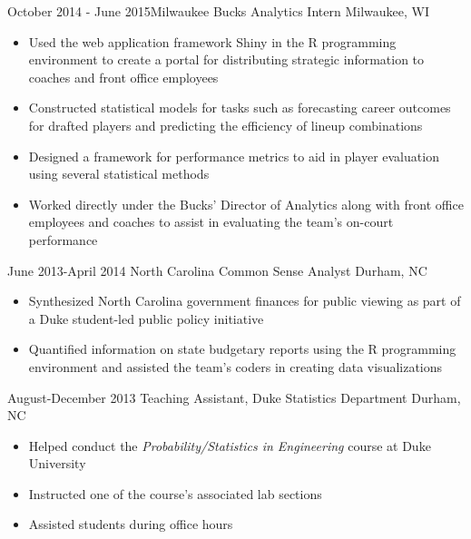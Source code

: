 \documentclass[10pt,a4paper,sans]{moderncv}        %
\begin{document}
\cventry
  {October 2014 - June 2015}{Milwaukee Bucks Analytics Intern}
  {}
  {Milwaukee, WI}
  {}
  {
    \begin{itemize}
      \item{Used the web application framework Shiny in the R programming environment to create a portal for distributing strategic information to coaches and front office employees}
      \item{Constructed statistical models for tasks such as forecasting career outcomes for drafted players and predicting the 
      efficiency of lineup combinations}
      \item{Designed a framework for performance metrics to aid in player evaluation using several statistical methods}
      \item{Worked directly under the Bucks' Director of Analytics along with front office employees and coaches to assist in evaluating 
      the team's on-court performance}
    \end{itemize}
  }

\cventry
  {June 2013-April 2014}
  {North Carolina Common Sense Analyst}
  {}
  {Durham, NC}
  {}
  {
    \begin{itemize}
      \item{Synthesized North Carolina government finances for public viewing as part of a Duke student-led public policy initiative}
      \item{Quantified information on state budgetary reports using the R programming environment and assisted the team's coders in creating 
      data visualizations}
    \end{itemize}
  }
    
\cventry
  {August-December 2013}
  {Teaching Assistant, Duke Statistics Department}
  {}
  {Durham, NC}
  {}
  {
    \begin{itemize}
      \item{Helped conduct the \emph{Probability/Statistics in Engineering} course at Duke University}
      \item{Instructed one of the course's associated lab sections} 
      \item{Assisted students during office hours}
    \end{itemize}
  }

\clearpage
\end{document}
